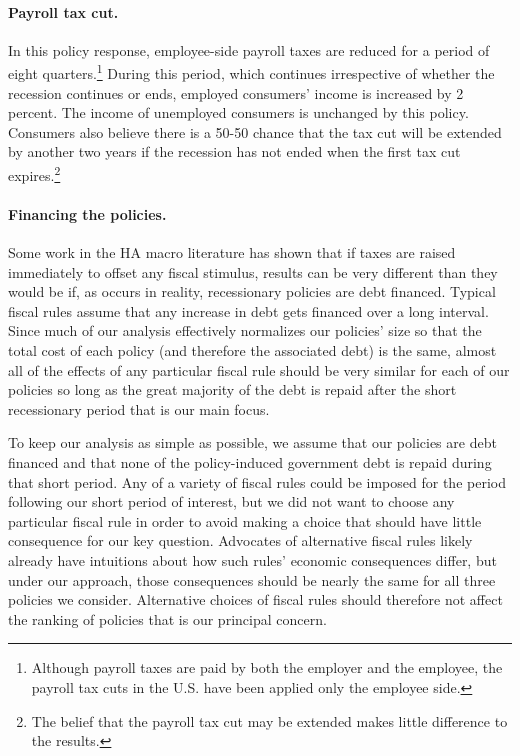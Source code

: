 \documentclass[\econtexRoot/EGMN]{subfiles}
\begin{document}
\paragraph{Payroll tax cut.} In this policy response, employee-side payroll taxes are reduced for a period of eight quarters.\footnote{Although payroll taxes are paid by both the employer and the employee, the payroll tax cuts in the U.S. have been applied only the employee side.} During this period, which continues irrespective of whether the recession continues or ends, employed consumers' income is increased by 2 percent. The income of unemployed consumers is unchanged by this policy. Consumers also believe there is a 50-50 chance that the tax cut will be extended by another two years if the recession has not ended when the first tax cut expires.\footnote{The belief that the payroll tax cut may be extended makes little difference to the results.}

\paragraph{Financing the policies.} Some work in the HA macro literature has shown that if taxes are raised immediately to offset any fiscal stimulus, results can be very different than they would be if, as occurs in reality, recessionary policies are debt financed.  Typical fiscal rules assume that any increase in debt gets financed over a long interval.  Since much of our analysis effectively normalizes our policies' size so that the total cost of each policy (and therefore the associated debt) is the same, almost all of the effects of any particular fiscal rule should be very similar for each of our policies so long as the great majority of the debt is repaid after the short recessionary period that is our main focus.

To keep our analysis as simple as possible, we assume that our policies are debt financed and that none of the policy-induced government debt is repaid during that short period.  Any of a variety of fiscal rules could be imposed for the period following our short period of interest, but we did not want to choose any particular fiscal rule in order to avoid making a choice that should have little consequence for our key question. Advocates of alternative fiscal rules likely already have intuitions about how such rules' economic consequences differ, but under our approach, those consequences should be nearly the same for all three policies we consider.  Alternative choices of fiscal rules should therefore not affect the ranking of policies that is our principal concern.
\end{document}
